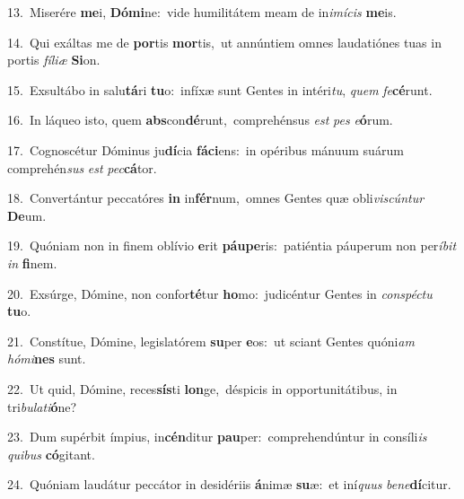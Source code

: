 {\numbfont\textcolor{\numbcolor}{13.}}~Miserére \textbf{me}\-i, \textbf{Dó}\-\textbf{mi}ne:~\star vide humilitátem meam de in\-\textit{i}\-\textit{mí}\textit{cis} \textbf{me}\-is.\par
{\numbfont\textcolor{\numbcolor}{14.}}~Qui exáltas me de \textbf{por}\-tis \textbf{mor}\-tis,~\star ut annúntiem omnes laudatiónes tuas in portis \textit{fí}\-\textit{li}\textit{æ} \textbf{Si}\-on.\par
{\numbfont\textcolor{\numbcolor}{15.}}~Exsultábo in salu\-\textbf{tá}\-ri \textbf{tu}\-o:~\star infíxæ sunt Gentes in intéri\-\textit{tu}\-, \textit{quem} \textit{fe}\-\textbf{cé}runt.\par
{\numbfont\textcolor{\numbcolor}{16.}}~In láqueo isto, quem \textbf{abs}\-con\-\textbf{dé}\-runt,~\star comprehénsus \textit{est} \textit{pes} \textit{e}\-\textbf{ó}rum.\par
{\numbfont\textcolor{\numbcolor}{17.}}~Cognoscétur Dóminus ju\-\textbf{dí}\-cia \textbf{fá}\-\textbf{ci}ens:~\star in opéribus mánuum suárum comprehén\textit{sus} \textit{est} \textit{pec}\-\textbf{cá}tor.\par
{\numbfont\textcolor{\numbcolor}{18.}}~Convertántur peccatóres \textbf{in} in\-\textbf{fér}\-num,~\star omnes Gentes quæ obli\-\textit{vis}\-\textit{cún}\textit{tur} \textbf{De}\-um.\par
{\numbfont\textcolor{\numbcolor}{19.}}~Quóniam non in finem oblívio \textbf{e}\-rit \textbf{páu}\-\textbf{pe}ris:~\star patiéntia páuperum non per\-\textit{í}\-\textit{bit} \textit{in} \textbf{fi}\-nem.\par
{\numbfont\textcolor{\numbcolor}{20.}}~Exsúrge, Dómine, non confor\-\textbf{té}\-tur \textbf{ho}\-mo:~\star judicéntur Gentes in \textit{con}\-\textit{spéc}\textit{tu} \textbf{tu}\-o.\par
{\numbfont\textcolor{\numbcolor}{21.}}~Constítue, Dómine, legislatórem \textbf{su}\-per \textbf{e}\-os:~\star ut sciant Gentes quóni\textit{am} \textit{hó}\-\textit{mi}\textbf{nes} sunt.\par
{\numbfont\textcolor{\numbcolor}{22.}}~Ut quid, Dómine, reces\-\textbf{sís}\-ti \textbf{lon}\-ge,~\star déspicis in opportunitátibus, in tri\-\textit{bu}\-\textit{la}\textit{ti}\textbf{ó}ne?\par
{\numbfont\textcolor{\numbcolor}{23.}}~Dum supérbit ímpius, in\-\textbf{cén}\-ditur \textbf{pau}\-per:~\star comprehendúntur in consíli\textit{is} \textit{qui}\-\textit{bus} \textbf{có}\-gitant.\par
{\numbfont\textcolor{\numbcolor}{24.}}~Quóniam laudátur peccátor in desidériis \textbf{á}\-nimæ \textbf{su}\-æ:~\star et iní\textit{quus} \textit{be}\-\textit{ne}\textbf{dí}citur.\par
